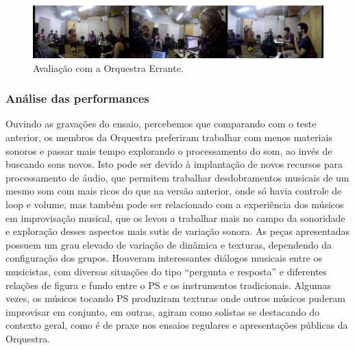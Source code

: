 \begin{figure}

\includegraphics[width=1\textwidth]{pictures/cap4/orquestra_errante_usertest}
\caption{\label{psorquestra}Avaliação com a Orquestra Errante.}
\label{fig:psorquestra}
\end{figure}

\subsubsection{Análise das performances}

Ouvindo as gravações do ensaio, percebemos que comparando com o teste anterior, os membros da Orquestra preferiram trabalhar com menos materiais sonoros e passar mais tempo explorando o processamento do som, ao invés de buscando sons novos. Isto pode ser devido à implantação de novos recursos para processamento de áudio, que permitem trabalhar desdobramentos musicais de um mesmo som com mais ricos do que na versão anterior, onde só havia controle de loop e volume, mas também pode ser relacionado com a experiência dos músicos em improvisação musical, que os levou a trabalhar mais no campo da sonoridade e exploração desses aspectos mais sutis de variação sonora. As peças apresentadas possuem um grau elevado de variação de dinâmica e texturas, dependendo da configuração dos grupos. Houveram interessantes diálogos musicais entre os musicistas, com diversas situações do tipo ``pergunta e resposta'' e diferentes relações de figura e fundo entre o PS e os instrumentos tradicionais. Algumas vezes, os músicos tocando PS produziram texturas onde outros músicos puderam improvisar em conjunto, em outras, agiram como solistas se destacando do contexto geral, como é de praxe nos ensaios regulares e apresentações públicas da Orquestra. 





